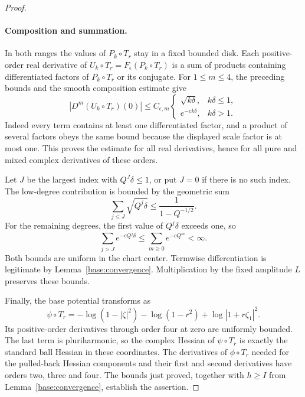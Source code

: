\begin{proof}
\paragraph{Composition and summation.}
In both ranges the values of $P_k\circ T_r$ stay in a fixed bounded
disk.  Each positive-order real derivative of
$U_k\circ T_r=F_\epsilon(P_k\circ T_r)$ is a sum of products
containing differentiated factors of $P_k\circ T_r$ or its
conjugate.  For $1\le m\le4$, the preceding bounds and the smooth
composition estimate give
\begin{equation}\label{base:scale-jets}
 |D^m(U_k\circ T_r)(0)|
 \le C_{\epsilon,m}
 \begin{cases}
  \sqrt{k\delta},&k\delta\le1,\\
  e^{-ck\delta},&k\delta>1.
 \end{cases}
\end{equation}
Indeed every term contains at least one differentiated factor,
and a product of several factors obeys the same bound because the
displayed scale factor is at most one.  This proves the estimate
for all real derivatives, hence for all pure and mixed complex
derivatives of these orders.

Let $J$ be the largest index with $Q^J\delta\le1$, or put $J=0$
if there is no such index.  The low-degree contribution is bounded
by the geometric sum
\[
 \sum_{j\le J}\sqrt{Q^j\delta}
 \le\frac1{1-Q^{-1/2}}.
\]
For the remaining degrees, the first value of $Q^j\delta$ exceeds
one, so
\[
 \sum_{j>J}e^{-cQ^j\delta}
 \le\sum_{m\ge0}e^{-cQ^m}<\infty.
\]
Both bounds are uniform in the chart center.  Termwise
differentiation is legitimate by Lemma~\ref{base:convergence}.
Multiplication by the fixed amplitude $L$ preserves these bounds.

Finally, the base potential transforms as
\[
 \psi\circ T_r
 =-\log(1-|\zeta|^2)-\log(1-r^2)
      +\log|1+r\zeta_1|^2.
\]
Its positive-order derivatives through order four at zero are
uniformly bounded.  The last term is pluriharmonic, so the complex
Hessian of $\psi\circ T_r$ is exactly the standard ball Hessian in
these coordinates.  The derivatives of $\phi\circ T_r$ needed for
the pulled-back Hessian components and their first and second
derivatives have orders two, three and four.  The bounds just
proved, together with $h\ge I$ from
Lemma~\ref{base:convergence}, establish the assertion.
\end{proof}

